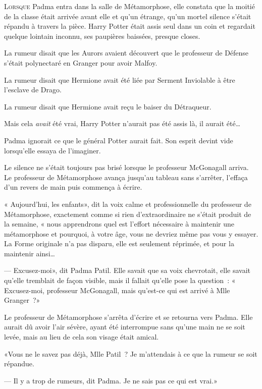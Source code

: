 
\lettrine{L}{orsque}  Padma entra dans la salle de Métamorphose, elle constata que la moitié de la classe était arrivée avant elle et qu'un étrange, qu'un mortel silence s'était répandu à travers la pièce. Harry Potter était assis seul dans un coin et regardait quelque lointain inconnu, ses paupières baissées, presque closes.

La rumeur disait que les Aurors avaient découvert que le professeur de Défense s'était polynectaré en Granger pour avoir Malfoy.

La rumeur disait que Hermione avait été liée par Serment Inviolable à être l'esclave de Drago.

La rumeur disait que Hermione avait reçu le baiser du Détraqueur.

Mais cela \emph{avait} été vrai, Harry Potter n'aurait pas été assis là, il aurait été…

Padma ignorait ce que le général Potter aurait fait. Son esprit devint vide lorsqu'elle essaya de l'imaginer.

Le silence ne s'était toujours pas brisé lorsque le professeur McGonagall arriva. Le professeur de Métamorphose avança jusqu'au tableau sans s'arrêter, l'effaça d'un revers de main puis commença à écrire.

« Aujourd'hui, les enfants», dit la voix calme et professionnelle du professeur de Métamorphose, exactement comme si rien d'extraordinaire ne s'était produit de la semaine, « nous apprendrons quel est l'effort nécessaire à maintenir une métamorphose et pourquoi, à votre âge, vous ne devriez même pas vous y essayer. La Forme originale n'a pas disparu, elle est seulement réprimée, et pour la maintenir ainsi… 

---  Excusez-moi», dit Padma Patil. Elle savait que sa voix chevrotait, elle savait qu'elle tremblait de façon visible, mais il fallait qu'elle pose la question~: « Excusez-moi, professeur McGonagall, mais qu'est-ce qui est arrivé à Mlle Granger~?»

Le professeur de Métamorphose s'arrêta d'écrire et se retourna vers Padma. Elle aurait dû avoir l'air sévère, ayant été interrompue sans qu'une main ne se soit levée, mais au lieu de cela son visage était amical.

«Vous ne le savez pas déjà, Mlle Patil~? Je m'attendais à ce que la rumeur se soit répandue. 

---  Il y a trop de rumeurs, dit Padma. Je ne sais pas ce qui est vrai.»

